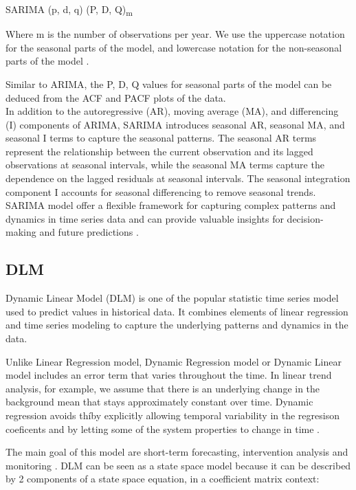 \documentclass{ieeeojies}
\begin{document}
       \centering SARIMA (p, d, q) (P, D, Q)\textsubscript{m}
\begin{flushleft}       
\hspace{0.4cm}Where m is the number of observations per year. We use the uppercase notation for the seasonal parts of the model, and lowercase notation for the non-seasonal parts of the model .

\hspace{0.4cm}Similar to ARIMA, the P, D, Q values for seasonal parts of the model can be deduced from the ACF and PACF plots of the data.\\
\hspace{0.4cm}In addition to the autoregressive (AR), moving average (MA), and differencing (I) components of ARIMA, SARIMA introduces seasonal AR, seasonal MA, and seasonal I terms to capture the seasonal patterns. The seasonal AR terms represent the relationship between the current observation and its lagged observations at seasonal intervals, while the seasonal MA terms capture the dependence on the lagged residuals at seasonal intervals. The seasonal integration component I accounts for seasonal differencing to remove seasonal trends. SARIMA model offer a flexible framework for capturing complex patterns and dynamics in time series data and can provide valuable insights for decision-making and future predictions \cite{sarima3}. \\
\end{flushleft}       
\subsection{DLM}

\begin{flushleft}       
\hspace{0.4cm}Dynamic Linear Model (DLM) is one of the popular statistic time series model used to predict values in historical data. It combines elements of linear regression and time series modeling to capture the underlying patterns and dynamics in the data.
\end{flushleft}    
\begin{flushleft}       
\hspace{0.4cm}Unlike Linear Regression model, Dynamic Regression model or Dynamic Linear model includes an error term that varies throughout the time. In linear trend analysis, for example, we assume that there is an underlying change in the background mean that stays approximately constant over time. Dynamic regression avoids thíby explicitly allowing temporal variability in the regresison coeficents and by letting some of the system properties to change in time \cite{dlm1}. 
\end{flushleft}    
\begin{flushleft}       
\hspace{0.4cm}The main goal of this model are short-term forecasting, intervention analysis and monitoring \cite{dlm2}. DLM can be seen as a state space model because it can be described by 2 components of a state space equation, in a coefficient matrix context:
\end{flushleft}  
\end{document}
